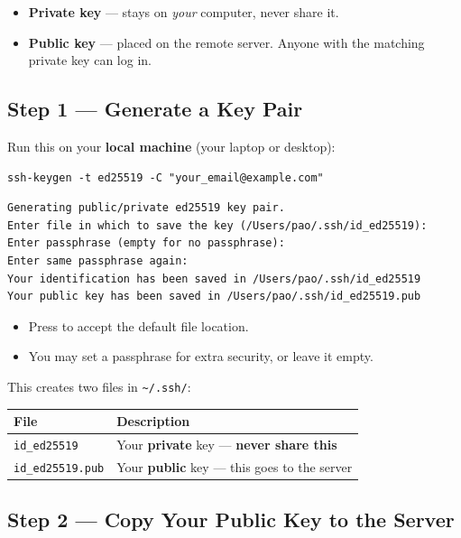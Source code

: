 \documentclass[12pt,a4paper]{article}
\newcommand{\key}[1]{\fbox{\small\ttfamily #1}}
\begin{document}
\begin{itemize}
  \item \textbf{Private key} --- stays on \emph{your} computer, never share it.
  \item \textbf{Public key} --- placed on the remote server. Anyone with the
        matching private key can log in.
\end{itemize}

\subsection{Step 1 --- Generate a Key Pair}

Run this on your \textbf{local machine} (your laptop or desktop):

\begin{lstlisting}[style=bash]
ssh-keygen -t ed25519 -C "your_email@example.com"
\end{lstlisting}

\begin{lstlisting}[style=terminal]
Generating public/private ed25519 key pair.
Enter file in which to save the key (/Users/pao/.ssh/id_ed25519):
Enter passphrase (empty for no passphrase):
Enter same passphrase again:
Your identification has been saved in /Users/pao/.ssh/id_ed25519
Your public key has been saved in /Users/pao/.ssh/id_ed25519.pub
\end{lstlisting}

\begin{itemize}
  \item Press \key{Enter} to accept the default file location.
  \item You may set a passphrase for extra security, or leave it empty.
\end{itemize}

This creates two files in \texttt{\textasciitilde/.ssh/}:

\begin{center}
\begin{tabular}{ll}
\toprule
\textbf{File} & \textbf{Description} \\
\midrule
\texttt{id\_ed25519}     & Your \textbf{private} key --- \textbf{never share this} \\
\texttt{id\_ed25519.pub} & Your \textbf{public} key --- this goes to the server \\
\bottomrule
\end{tabular}
\end{center}

\subsection{Step 2 --- Copy Your Public Key to the Server}
\end{document}
